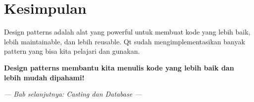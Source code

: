 \section{Kesimpulan}

Design patterns adalah alat yang powerful untuk membuat kode yang lebih baik, lebih maintainable, dan lebih reusable. Qt sudah mengimplementasikan banyak pattern yang bisa kita pelajari dan gunakan.

\begin{center}
\textbf{Design patterns membantu kita menulis kode yang lebih baik dan lebih mudah dipahami!}
\end{center}

\vspace{1cm}

\begin{center}
\textit{--- Bab selanjutnya: Casting dan Database ---}
\end{center} 